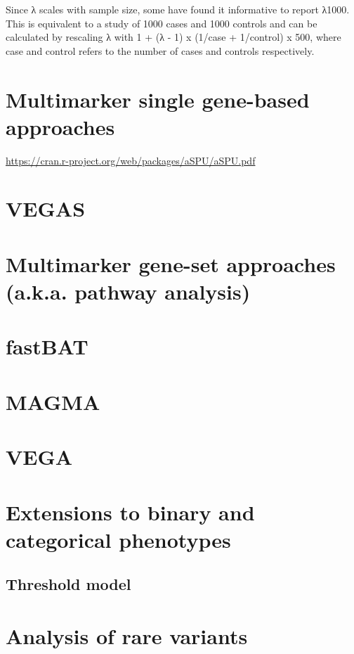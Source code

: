 \documentclass[]{book}
\theoremstyle{definition}
\theoremstyle{definition}
\theoremstyle{definition}
\theoremstyle{remark}
\begin{document}
Since λ scales with sample size, some have found it informative to
report λ1000. This is equivalent to a study of 1000 cases and 1000
controls and can be calculated by rescaling λ with 1 + (λ - 1) x (1/case
+ 1/control) x 500, where case and control refers to the number of cases
and controls respectively.

\section{Multimarker single gene-based
approaches}\label{multimarker-single-gene-based-approaches}

\url{https://cran.r-project.org/web/packages/aSPU/aSPU.pdf}

\section{VEGAS}\label{vegas}

\section{Multimarker gene-set approaches (a.k.a. pathway
analysis)}\label{multimarker-gene-set-approaches-a.k.a.-pathway-analysis}

\section{fastBAT}\label{fastbat}

\section{MAGMA}\label{magma}

\section{VEGA}\label{vega}

\section{Extensions to binary and categorical
phenotypes}\label{extensions-to-binary-and-categorical-phenotypes}

\subsection{Threshold model}\label{threshold-model}

\section{Analysis of rare variants}\label{analysis-of-rare-variants}
\end{document}
